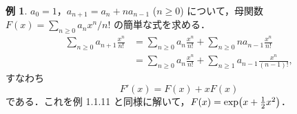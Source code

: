 \documentclass[xelatex,ja=standard,a4paper,14pt]{bxjsarticle}
\newcommand{\paren}[1]{\mleft(#1\mright)}
\theoremstyle{definition}
\newtheorem{example}[theorem]{例}
\begin{document}
\begin{example}
    $a_0 = 1$，$a_{n+1} = a_n + n a_{n-1}$ ($n \geq 0$) について，母関数 $F(x) = \sum_{n \geq 0} a_n x^n/n!$ の簡単な式を求める． \begin{align*}
        \sum_{n \geq 0} a_{n+1} \frac{x^n}{n!}
         & = \sum_{n \geq 0} a_n \frac{x^n}{n!}
        + \sum_{n \geq 0} n a_{n-1} \frac{x^n}{n!} \\
         & = \sum_{n \geq 0} a_n \frac{x^n}{n!}
        + \sum_{n \geq 1} a_{n-1} \frac{x^n}{(n-1)!},
    \end{align*}
    すなわち \begin{equation*}
        F'(x) = F(x) + xF(x)
    \end{equation*}
    である．これを例 1.1.11 と同様に解いて，$F(x) = \exp\paren{x + \frac{1}{2} x^2}$．
\end{example}
\end{document}
